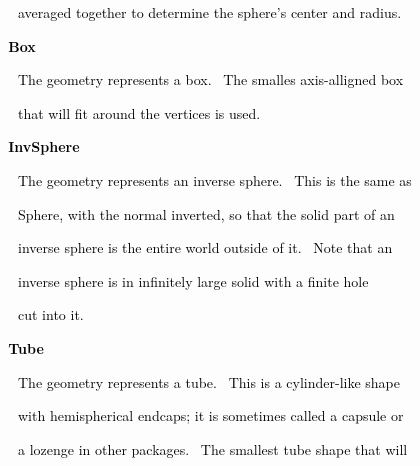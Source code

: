 \documentclass[a4paper]{article}
\newcommand\textstyleOOoComputerKeyWord[1]{\textrm{\textcolor[rgb]{0.0,0.0,0.5019608}{#1}}}
\begin{document}
{\color{black}
\textstyleOOoComputerKeyWord{\textcolor{black}{\ \ \ \ \ \ averaged together to determine the sphere's center and
radius.}}}

\clearpage
\bigskip


\bigskip

{\bfseries
\hypertarget{RefHeading7702869075401}{}\textstyleOOoComputerKeyWord{\textcolor{black}{\ \ \ \ Box}}}


\bigskip

{\color{black}
\textstyleOOoComputerKeyWord{\textcolor{black}{\ \ \ \ \ \ The geometry represents a box. \ The smalles axis-alligned
box}}}

{\color{black}
\textstyleOOoComputerKeyWord{\textcolor{black}{\ \ \ \ \ \ that will fit around the vertices is used.}}}


\bigskip

{\bfseries
\hypertarget{RefHeading7704869075401}{}\textstyleOOoComputerKeyWord{\textcolor{black}{\ \ \ \ InvSphere}}}


\bigskip

{\color{black}
\textstyleOOoComputerKeyWord{\textcolor{black}{\ \ \ \ \ \ The geometry represents an inverse sphere. \ This is the same
as}}}

{\color{black}
\textstyleOOoComputerKeyWord{\textcolor{black}{\ \ \ \ \ \ Sphere, with the normal inverted, so that the solid part of
an}}}

{\color{black}
\textstyleOOoComputerKeyWord{\textcolor{black}{\ \ \ \ \ \ inverse sphere is the entire world outside of it. \ Note that
an}}}

{\color{black}
\textstyleOOoComputerKeyWord{\textcolor{black}{\ \ \ \ \ \ inverse sphere is in infinitely large solid with a finite
hole}}}

{\color{black}
\textstyleOOoComputerKeyWord{\textcolor{black}{\ \ \ \ \ \ cut into it.}}}


\bigskip

{\bfseries
\hypertarget{RefHeading7706869075401}{}\textstyleOOoComputerKeyWord{\textcolor{black}{\ \ \ \ Tube}}}


\bigskip

{\color{black}
\textstyleOOoComputerKeyWord{\textcolor{black}{\ \ \ \ \ \ The geometry represents a tube. \ This is a cylinder-like
shape}}}

{\color{black}
\textstyleOOoComputerKeyWord{\textcolor{black}{\ \ \ \ \ \ with hemispherical endcaps; it is sometimes called a capsule
or}}}

{\color{black}
\textstyleOOoComputerKeyWord{\textcolor{black}{\ \ \ \ \ \ a lozenge in other packages. \ The smallest tube shape that
will}}}
\end{document}
